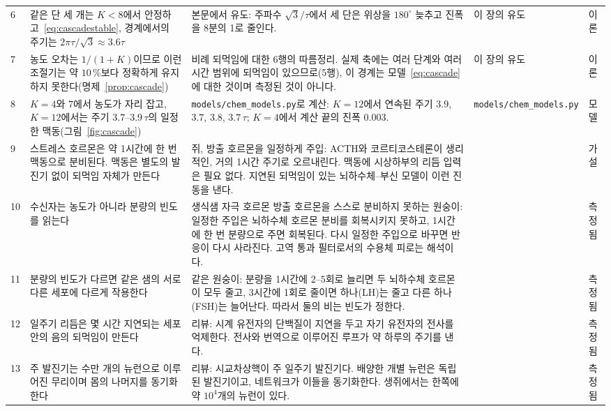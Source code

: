 {\begin{longtable}{>{\raggedright}p{0.5cm}>{\raggedright}p{4.0cm}>{\raggedright}p{5.6cm}>{\raggedright}p{2.3cm}>{\raggedright\arraybackslash}p{1.7cm}}
6 & 같은 단 세 개는 $K<8$에서 안정하고~\eqref{eq:cascadestable}, 경계에서의 주기는 $2\pi\tau/\sqrt3\approx3.6\tau$ & 본문에서 유도: 주파수 $\sqrt3/\tau$에서 세 단은 위상을 $180^\circ$ 늦추고 진폭을 $8$분의 1로 줄인다. & 이 장의 유도 & 이론 \\
7 & 농도 오차는 $1/(1+K)$이므로 이런 조절기는 약 $10\,\%$보다 정확하게 유지하지 못한다(명제~\ref{prop:cascade}) & 비례 되먹임에 대한 6행의 따름정리. 실제 축에는 여러 단계와 여러 시간 범위에 되먹임이 있으므로(5행), 이 경계는 모델~\eqref{eq:cascade}에 대한 것이며 측정된 것이 아니다. & 이 장의 유도 & 이론 \\
8 & $K=4$와 $7$에서 농도가 자리 잡고, $K=12$에서는 주기 $3.7$--$3.9\,\tau$의 일정한 맥동(그림~\ref{fig:cascade}) & \texttt{models/\allowbreak chem\_\allowbreak models.py}로 계산: $K=12$에서 연속된 주기 $3.9$, $3.7$, $3.8$, $3.7\,\tau$; $K=4$에서 계산 끝의 진폭 $0.003$. & \texttt{models/\allowbreak chem\_\allowbreak models.py} & 모델 \\
9 & 스트레스 호르몬은 약 1시간에 한 번 맥동으로 분비된다. 맥동은 별도의 발진기 없이 되먹임 자체가 만든다 & 쥐, 방출 호르몬을 일정하게 주입: ACTH와 코르티코스테론이 생리적인, 거의 1시간 주기로 오르내린다. 맥동에 시상하부의 리듬 입력은 필요 없다. 지연된 되먹임이 있는 뇌하수체--부신 모델이 이런 진동을 낸다. & \cite{Walker2012glc, Walker2010} & 가설 \\
10 & 수신자는 농도가 아니라 분량의 빈도를 읽는다 & 생식샘 자극 호르몬 방출 호르몬을 스스로 분비하지 못하는 원숭이: 일정한 주입은 뇌하수체 호르몬 분비를 회복시키지 못하고, 1시간에 한 번 분량으로 주면 회복된다. 다시 일정한 주입으로 바꾸면 반응이 다시 사라진다. 고역 통과 필터로서의 수용체 피로는 해석이다. & \cite{Belchetz1978} & 측정됨 \\
11 & 분량의 빈도가 다르면 같은 샘의 서로 다른 세포에 다르게 작용한다 & 같은 원숭이: 분량을 1시간에 $2$--$5$회로 늘리면 두 뇌하수체 호르몬이 모두 줄고, $3$시간에 1회로 줄이면 하나(LH)는 줄고 다른 하나(FSH)는 늘어난다. 따라서 둘의 비는 빈도가 정한다. & \cite{Wildt1981gnrh} & 측정됨 \\
12 & 일주기 리듬은 몇 시간 지연되는 세포 안의 음의 되먹임이 만든다 & 리뷰: 시계 유전자의 단백질이 지연을 두고 자기 유전자의 전사를 억제한다. 전사와 번역으로 이루어진 루프가 약 하루의 주기를 낸다. & \cite{TakahashiJS2017} & 측정됨 \\
13 & 주 발진기는 수만 개의 뉴런으로 이루어진 무리이며 몸의 나머지를 동기화한다 & 리뷰: 시교차상핵이 주 일주기 발진기다. 배양한 개별 뉴런은 독립된 발진기이고, 네트워크가 이들을 동기화한다. 생쥐에서는 한쪽에 약 $10^4$개의 뉴런이 있다. & \cite{Welsh2010scn} & 측정됨 \\

\end{longtable}}
